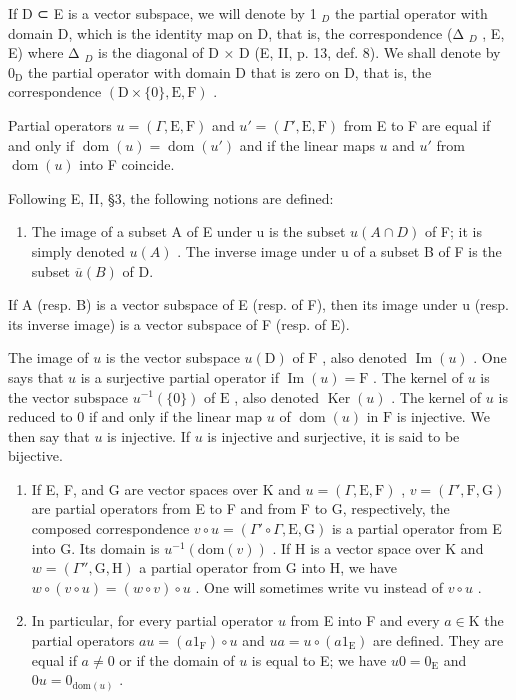If D ⊂ E is a vector subspace, we will denote by 1 \(_{D}\) the partial operator with domain D, which is the identity map on D, that is, the correspondence (Δ \(_{D}\) , E, E) where Δ \(_{D}\) is the diagonal of D × D (E, II, p. 13, def. 8). We shall denote by \(0_{\mathrm{D}}\) the partial operator with domain D that is zero on D, that is, the correspondence \((\mathrm{D} \times \{0\}, \mathrm{E}, \mathrm{F})\) .

Partial operators \(u = (\Gamma, \mathrm{E}, \mathrm{F})\) and \(u' = (\Gamma', \mathrm{E}, \mathrm{F})\) from E to F are equal if and only if \(\operatorname{dom}(u) = \operatorname{dom}(u')\) and if the linear maps \(u\) and \(u'\) from \(\operatorname{dom}(u)\) into F coincide.

Following E, II, §3, the following notions are defined:

\begin{enumerate}
\def\labelenumi{(\roman{enumi})}
\tightlist
\item
  The image of a subset A of E under u is the subset \(u(A \cap D)\) of F; it is simply denoted \(u(A)\) . The inverse image under u of a subset B of F is the subset \(\overline{u}(B)\) of D.
\end{enumerate}

If A (resp. B) is a vector subspace of E (resp. of F), then its image under u (resp. its inverse image) is a vector subspace of F (resp. of E).

The image of \(u\) is the vector subspace \(u(\mathrm{D})\) of \(\mathrm{F}\) , also denoted \(\operatorname{Im}(u)\) . One says that \(u\) is a surjective partial operator if \(\operatorname{Im}(u) = \mathrm{F}\) . The kernel of \(u\) is the vector subspace \(u^{-1}(\{0\})\) of \(\mathrm{E}\) , also denoted \(\operatorname{Ker}(u)\) . The kernel of \(u\) is reduced to 0 if and only if the linear map \(u\) of \(\operatorname{dom}(u)\) in \(\mathrm{F}\) is injective. We then say that \(u\) is injective. If \(u\) is injective and surjective, it is said to be bijective.

\begin{enumerate}
\def\labelenumi{(\roman{enumi})}
\setcounter{enumi}{1}
\item
  If E, F, and G are vector spaces over K and \(u = (\Gamma, \mathrm{E}, \mathrm{F})\) , \(v = (\Gamma', \mathrm{F}, \mathrm{G})\) are partial operators from E to F and from F to G, respectively, the composed correspondence \(v \circ u = (\Gamma' \circ \Gamma, \mathrm{E}, \mathrm{G})\) is a partial operator from E into G. Its domain is \(u^{-1}(\mathrm{dom}(v))\) . If H is a vector space over K and \(w = (\Gamma'', \mathrm{G}, \mathrm{H})\) a partial operator from G into H, we have \(w \circ (v \circ u) = (w \circ v) \circ u\) . One will sometimes write vu instead of \(v \circ u\) .
\item
  In particular, for every partial operator \(u\) from E into F and every \(a \in \mathrm{K}\) the partial operators \(au = (a1_{\mathrm{F}}) \circ u\) and \(ua = u \circ (a1_{\mathrm{E}})\) are defined. They are equal if \(a \neq 0\) or if the domain of \(u\) is equal to E; we have \(u0 = 0_{\mathrm{E}}\) and \(0u = 0_{\mathrm{dom}(u)}\) .
\end{enumerate}

